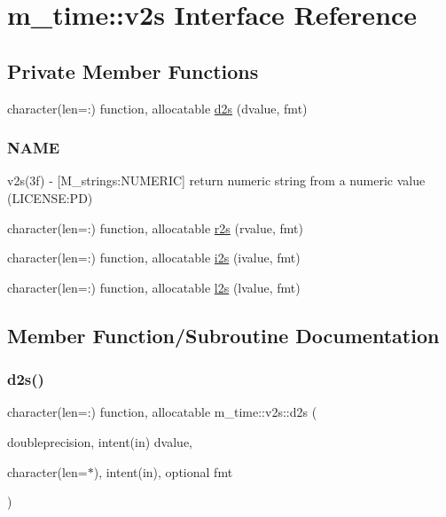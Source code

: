 \hypertarget{interfacem__time_1_1v2s}{}\section{m\+\_\+time\+:\+:v2s Interface Reference}
\label{interfacem__time_1_1v2s}
\subsection*{Private Member Functions}
\begin{DoxyCompactItemize}
\item 
character(len=\+:) function, allocatable \mbox{\hyperlink{interfacem__time_1_1v2s_ac96c5488b421f591abf5db4ab5aee7b0}{d2s}} (dvalue, fmt)
\begin{DoxyCompactList}\small\item\em \subsubsection*{N\+A\+ME}

v2s(3f) -\/ \mbox{[}M\+\_\+strings\+:N\+U\+M\+E\+R\+IC\mbox{]} return numeric string from a numeric value (L\+I\+C\+E\+N\+SE\+:PD) \end{DoxyCompactList}\item 
character(len=\+:) function, allocatable \mbox{\hyperlink{interfacem__time_1_1v2s_a5bc519244bd303a3dbad639743c0cff2}{r2s}} (rvalue, fmt)
\item 
character(len=\+:) function, allocatable \mbox{\hyperlink{interfacem__time_1_1v2s_aa950b277049afb5e6dac9c55c78d9539}{i2s}} (ivalue, fmt)
\item 
character(len=\+:) function, allocatable \mbox{\hyperlink{interfacem__time_1_1v2s_a6daa793a11022426b014474553d812c5}{l2s}} (lvalue, fmt)
\end{DoxyCompactItemize}


\subsection{Member Function/\+Subroutine Documentation}
\mbox{\label{interfacem__time_1_1v2s_ac96c5488b421f591abf5db4ab5aee7b0}} 
\subsubsection{\texorpdfstring{d2s()}{d2s()}}
{\footnotesize\ttfamily character(len=\+:) function, allocatable m\+\_\+time\+::v2s\+::d2s (\begin{DoxyParamCaption}\item[{doubleprecision, intent(in)}]{dvalue,  }\item[{character(len=$\ast$), intent(in), optional}]{fmt }\end{DoxyParamCaption})\hspace{0.3cm}{\ttfamily [private]}}



